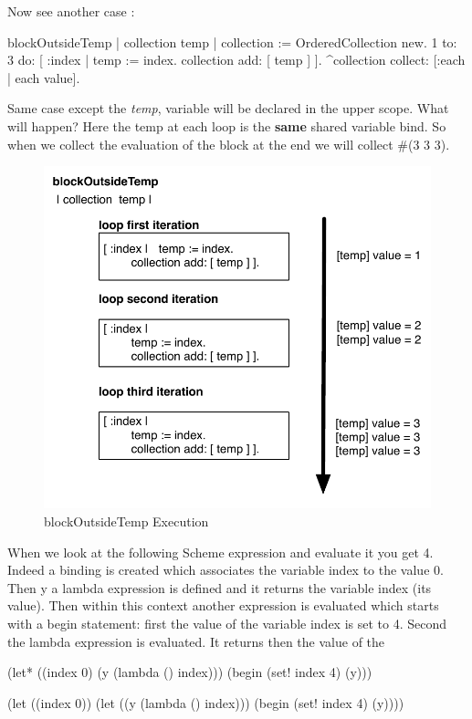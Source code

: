 \documentclass[a4paper,10pt,twoside]{book}
\begin{document}
Now see another case :
\begin{code}{}
blockOutsideTemp
		| collection temp |
		collection := OrderedCollection new.
		1 to: 3 do: [ :index |
			temp := index.
			collection add: [ temp ] ].
		^collection collect: [:each | each value].
\end{code}
Same case except the \emph{temp}, variable will be declared in the upper scope. What will happen? Here the temp at each loop is the \textbf{same} shared variable bind. So when we collect the evaluation of the block at the end we will collect \#(3 3 3).
\begin{figure}[htbp]
	\centering
		\includegraphics[width=0.7\linewidth]{blockClosureOutsideTemp}
	\caption{blockOutsideTemp Execution}
	\label{fig:blockClosureOutsideTemp}
\end{figure}

When we look at the following Scheme expression and evaluate it you get 4. Indeed a binding is created
which associates the variable index to the value 0. Then y a lambda expression is defined and it returns
 the variable index (its value). Then within this context another expression is evaluated which starts
with a begin statement: first the value of the variable index is set to 4. Second the lambda expression is
evaluated. It returns then the value of the

\begin{code}{}
(let* ((index 0)
       (y (lambda () index)))
  (begin
    (set! index 4)
    (y)))
\end{code}

\begin{code}{}
(let ((index 0))
  (let ((y (lambda () index)))
    (begin
      (set! index 4)
      (y))))
\end{code}
\end{document}
